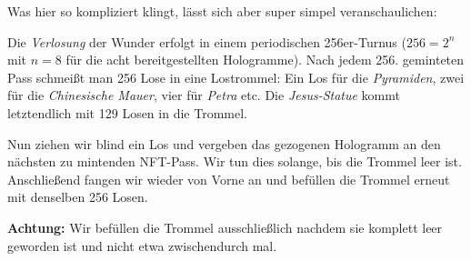 \vspace{0.3cm}

Was hier so kompliziert klingt, lässt sich aber super simpel veranschaulichen:

Die \textit{Verlosung} der Wunder erfolgt in einem periodischen 256er-Turnus ($256 = 2^{n}$ mit $n=8$ für die acht bereitgestellten Hologramme). Nach jedem 256. geminteten Pass schmeißt man 256 Lose in eine Lostrommel: Ein Los für die \textit{Pyramiden}, zwei für die \textit{Chinesische Mauer}, vier für \textit{Petra} etc. Die \textit{Jesus-Statue} kommt letztendlich mit 129 Losen in die Trommel.

Nun ziehen wir blind ein Los und vergeben das gezogenen Hologramm an den nächsten zu mintenden NFT-Pass. Wir tun dies solange, bis die Trommel leer ist. Anschließend fangen wir wieder von Vorne an und befüllen die Trommel erneut mit denselben 256 Losen.

\textbf{Achtung:} Wir befüllen die Trommel ausschließlich nachdem sie komplett leer geworden ist und nicht etwa zwischendurch mal.

\vspace{0.3cm}

